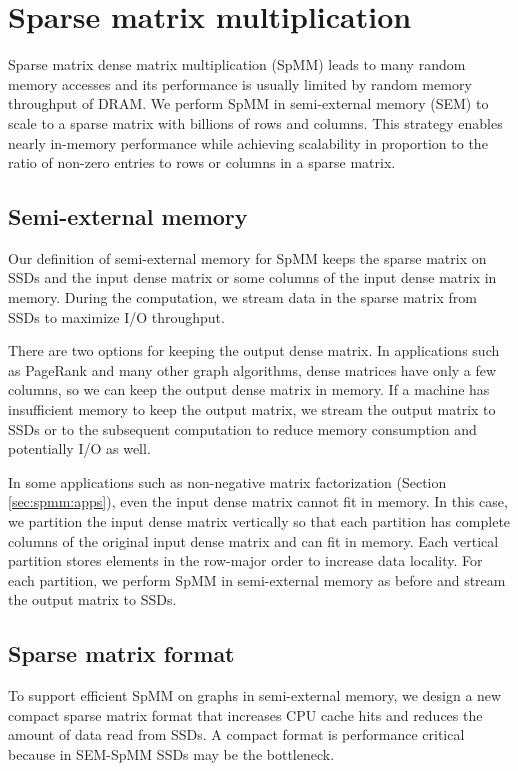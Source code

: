 \section{Sparse matrix multiplication} \label{sec:spmm}
Sparse matrix dense matrix multiplication (SpMM) leads to many random memory
accesses and its performance is usually limited by random memory throughput
of DRAM. We perform SpMM in semi-external memory (SEM)
to scale to a sparse matrix with billions of rows and columns. This strategy enables
nearly in-memory performance while achieving scalability in proportion
to the ratio of non-zero entries to rows or columns in a sparse matrix.

\subsection{Semi-external memory}
Our definition of semi-external memory for SpMM
keeps the sparse matrix on SSDs and the input dense matrix or some columns
of the input dense matrix in memory. During the computation, we stream
data in the sparse matrix from SSDs to maximize I/O throughput.

There are two options for keeping the output dense matrix. In applications
such as PageRank and many other graph
algorithms, dense matrices have only a few columns, so we can keep the output
dense matrix in memory. If a machine has insufficient
memory to keep the output matrix, we stream the output matrix
to SSDs or to the subsequent computation to reduce memory consumption and
potentially I/O as well.

In some applications such as non-negative matrix factorization (Section
\ref{sec:spmm:apps}), even the input dense matrix cannot fit in memory. In this case,
we partition the input dense matrix vertically so that each partition has
complete columns of the original input dense matrix and can fit in memory.
Each vertical partition stores elements in the row-major order to increase
data locality. For each partition, we perform SpMM
in semi-external memory as before and stream the output matrix to SSDs.

\subsection{Sparse matrix format}
To support efficient SpMM on graphs in semi-external memory, we design a new compact
sparse matrix format that increases CPU cache hits and reduces the amount of data
read from SSDs. A compact format is performance critical because in SEM-SpMM SSDs
may be the bottleneck.

